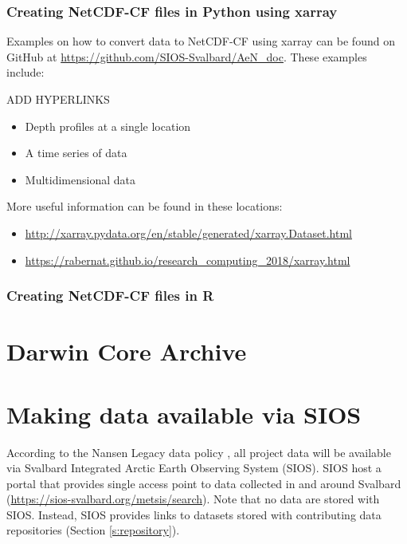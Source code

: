 \documentclass[a4paper,english, 11pt]{article}
\begin{document}
\subsubsection{Creating NetCDF-CF files in Python using xarray}
\label{ss:xarray}

Examples on how to convert data to NetCDF-CF using xarray can be found on GitHub at \href{https://github.com/SIOS-Svalbard/AeN_doc}{https://github.com/SIOS-Svalbard/AeN\_doc}. These examples include:

ADD HYPERLINKS

\begin{itemize}
\item{Depth profiles at a single location}
\item{A time series of data} 
\item{Multidimensional data}
\end{itemize}



More useful information can be found in these locations:
\begin{itemize}
\item \href{http://xarray.pydata.org/en/stable/generated/xarray.Dataset.html}{http://xarray.pydata.org/en/stable/generated/xarray.Dataset.html}
\item \href{https://rabernat.github.io/research_computing_2018/xarray.html}{https://rabernat.github.io/research\_computing\_2018/xarray.html}
\end{itemize}


\subsubsection{Creating NetCDF-CF files in R}
\label{ss:R}


\section{Darwin Core Archive}
\label{s:DwCA}

\section{Making data available via SIOS}
\label{s:SIOS}

According to the Nansen Legacy data policy \citep{aendatapolicy2021}, all project data will be available via Svalbard Integrated Arctic Earth Observing System (SIOS). SIOS host a portal that provides single access point to data collected in and around Svalbard (\href{https://sios-svalbard.org/metsis/search}{https://sios-svalbard.org/metsis/search}).
Note that no data are stored with SIOS. Instead, SIOS provides links to datasets stored with contributing data repositories (Section \ref{s:repository}). 
\end{document}
